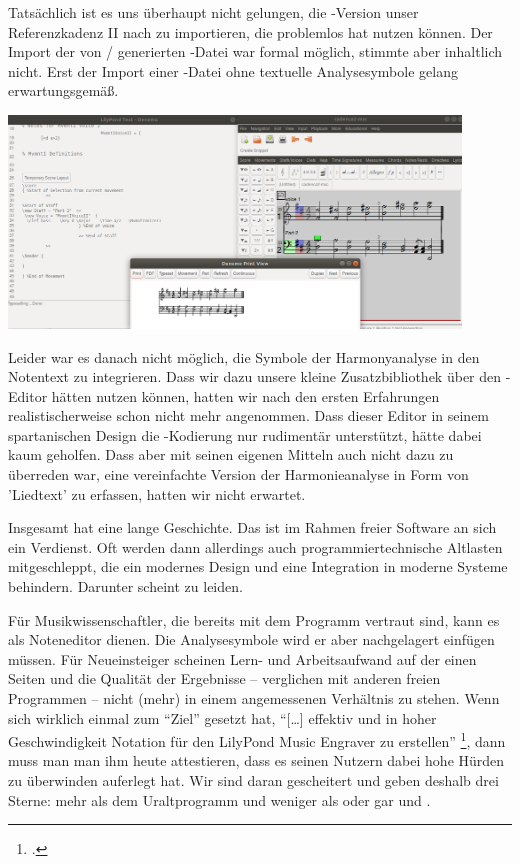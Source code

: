 Tatsächlich ist es uns überhaupt nicht gelungen, die -Version
unser Referenzkadenz II nach   zu importieren, die 
problemlos hat nutzen können. Der Import der von  /
 generierten -Datei war formal möglich, stimmte aber
inhaltlich nicht. Erst der Import einer -Datei ohne textuelle
Analysesymbole gelang erwartungsgemäß.

\begin{center}
\includegraphics[width=0.9\textwidth]{frontends/denemo/denemo-cadenca2-300dpi.png}
\end{center}

Leider war es danach nicht möglich, die Symbole der Harmonyanalyse in den
Notentext zu integrieren. Dass wir dazu unsere kleine Zusatzbibliothek über den
-Editor hätten nutzen können, hatten wir nach den ersten
Erfahrungen realistischerweise schon nicht mehr angenommen. Dass dieser Editor in
seinem spartanischen Design die -Kodierung nur rudimentär
unterstützt, hätte dabei kaum geholfen. Dass aber  mit seinen
eigenen Mitteln auch nicht dazu zu überreden war, eine vereinfachte Version der
Harmonieanalyse in Form von 'Liedtext' zu erfassen, hatten wir nicht erwartet.

Insgesamt hat  eine lange Geschichte. Das ist im Rahmen freier
Software an sich ein Verdienst. Oft werden dann allerdings auch
programmiertechnische Altlasten mitgeschleppt, die ein modernes Design
und eine Integration in moderne Systeme behindern. Darunter scheint 
zu leiden.

Für Musikwissenschaftler, die bereits mit dem Programm vertraut sind, kann es
als Noteneditor dienen. Die Analysesymbole wird er aber nachgelagert einfügen
müssen. Für Neueinsteiger scheinen Lern- und Arbeitsaufwand auf der einen Seiten
und die Qualität der Ergebnisse -- verglichen mit anderen freien Programmen --
nicht (mehr) in einem angemessenen Verhältnis zu stehen. Wenn  sich
wirklich einmal zum \enquote{Ziel} gesetzt hat, \enquote{[\ldots] effektiv und
in hoher Geschwindigkeit Notation für den LilyPond Music Engraver zu erstellen}
\footcite[vgl.][\nopage wp.]{WpedDenemo2018a}, dann muss man man ihm heute
attestieren, dass es seinen Nutzern dabei hohe Hürden zu überwinden auferlegt
hat. Wir sind daran gescheitert und geben  deshalb drei Sterne:
mehr als dem Uraltprogramm  und weniger als  oder gar 
 und .
%
